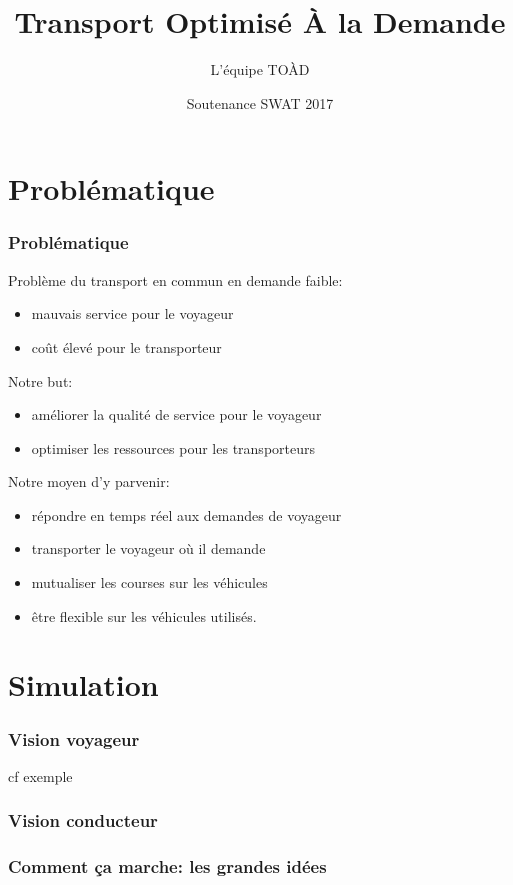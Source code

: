 \documentclass[table]{beamer}
\title{Transport Optimisé À la Demande}
\author{L'équipe TOÀD}
\institute[Kisio Digital] %
{
  Kisio Digital\\
  20 rue Hector Malot\\
  75012 Paris, France}
\date{Soutenance SWAT 2017}
\begin{document}
\begin{frame}
  \titlepage
\end{frame}

\section{Problématique}

\begin{frame}
  \frametitle{Problématique}

  Problème du transport en commun en demande faible:
  \begin{itemize}
  \item mauvais service pour le voyageur
  \item coût élevé pour le transporteur
  \end{itemize}

  Notre but:
  \begin{itemize}
  \item améliorer la qualité de service pour le voyageur
  \item optimiser les ressources pour les transporteurs
  \end{itemize}

  Notre moyen d'y parvenir:
  \begin{itemize}
  \item répondre en temps réel aux demandes de voyageur
  \item transporter le voyageur où il demande
  \item mutualiser les courses sur les véhicules
  \item être flexible sur les véhicules utilisés.
  \end{itemize}
\end{frame}

\section{Simulation}

\begin{frame}
  \frametitle{Vision voyageur}

  cf exemple
\end{frame}

\begin{frame}
  \frametitle{Vision conducteur}
\end{frame}

\begin{frame}
  \frametitle{Comment ça marche: les grandes idées}
\end{frame}
\end{document}
